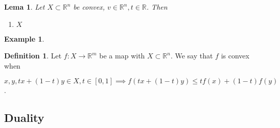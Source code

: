 \documentclass[]{article}
\newtheorem{lemma}{Lema}[section]
\theoremstyle{definition}
\newtheorem{definition}{Definition}[section]
\theoremstyle{definition}
\newtheorem{exmp}{Example}[section]
\newcommand{\raw}{\rightarrow}
\newcommand{\bb}{\mathbb}
\begin{document}
		\begin{lemma}
			Let $X \subset \bb{R}^n$ be convex, $v \in \bb{R}^n, t \in \bb{R}$. Then
			
			\begin{enumerate}
				\item $X$
			\end{enumerate} 
		\end{lemma}
		
		\begin{exmp}
			
		\end{exmp}
		
		\begin{definition}
			Let $f: X \raw \bb{R}^m$ be a map with $X \subset \bb{R}^n$. We say that $f$ is convex when
			
			\begin{center}
				$x, y, tx + (1-t)y \in X, t \in [0, 1]  \implies f(tx + (1-t)y) \leq tf(x) + (1-t)f(y)$.
			\end{center}
			
		\end{definition}




		\subsection{Duality}
		\subsection{}
	
	
	
	
	
	
\end{document}
